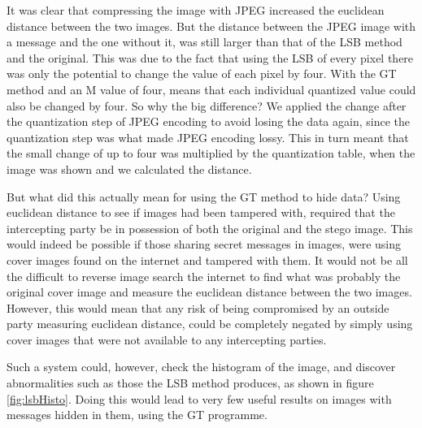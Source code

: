 It was clear that compressing the image with JPEG increased the euclidean distance between the two images.
But the distance between the JPEG image with a message and the one without it, was still larger than that of the LSB method and the original.
This was due to the fact that using the LSB of every pixel there was only the potential to change the value of each pixel by four.
With the GT method and an M value of four, means that each individual quantized value could also be changed by four. 
So why the big difference? 
We applied the change after the quantization step of JPEG encoding to avoid losing the data again, since the quantization step was what made JPEG encoding lossy.
This in turn meant that the small change of up to four was multiplied by the quantization table, when the image was shown and we calculated the distance.

But what did this actually mean for using the GT method to hide data?
Using euclidean distance to see if images had been tampered with, required that the intercepting party be in possession of both the original and the stego image.
This would indeed be possible if those sharing secret messages in images, were using cover images found on the internet and tampered with them.
It would not be all the difficult to reverse image search the internet to find what was probably the original cover image and measure the euclidean distance between the two images.
However, this would mean that any risk of being compromised by an outside party measuring euclidean distance, could be completely negated by simply using cover images that were not available to any intercepting parties.


Such a system could, however, check the histogram of the image, and discover abnormalities such as those the LSB method produces, as shown in figure \ref{fig:lsbHisto}.
Doing this would lead to very few useful results on images with messages hidden in them, using the GT programme.